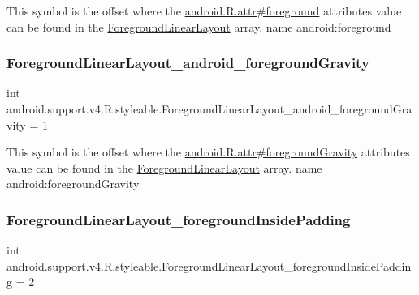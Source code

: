 This symbol is the offset where the \hyperlink{}{android.\+R.\+attr\#foreground} attribute\textquotesingle{}s value can be found in the \hyperlink{classandroid_1_1support_1_1v4_1_1R_1_1styleable_aa17438061ec7746b98c639b096be8466}{Foreground\+Linear\+Layout} array.  name android\+:foreground \mbox{\label{classandroid_1_1support_1_1v4_1_1R_1_1styleable_adfb8b15836c97c4558927711664009e7}} 
\subsubsection{\texorpdfstring{Foreground\+Linear\+Layout\+\_\+android\+\_\+foreground\+Gravity}{ForegroundLinearLayout\_android\_foregroundGravity}}
{\footnotesize\ttfamily int android.\+support.\+v4.\+R.\+styleable.\+Foreground\+Linear\+Layout\+\_\+android\+\_\+foreground\+Gravity = 1\hspace{0.3cm}{\ttfamily [static]}}

This symbol is the offset where the \hyperlink{}{android.\+R.\+attr\#foreground\+Gravity} attribute\textquotesingle{}s value can be found in the \hyperlink{classandroid_1_1support_1_1v4_1_1R_1_1styleable_aa17438061ec7746b98c639b096be8466}{Foreground\+Linear\+Layout} array.  name android\+:foreground\+Gravity \mbox{\label{classandroid_1_1support_1_1v4_1_1R_1_1styleable_afc40e43edb351c309af23e1c6b1d91c9}} 
\subsubsection{\texorpdfstring{Foreground\+Linear\+Layout\+\_\+foreground\+Inside\+Padding}{ForegroundLinearLayout\_foregroundInsidePadding}}
{\footnotesize\ttfamily int android.\+support.\+v4.\+R.\+styleable.\+Foreground\+Linear\+Layout\+\_\+foreground\+Inside\+Padding = 2\hspace{0.3cm}{\ttfamily [static]}}


